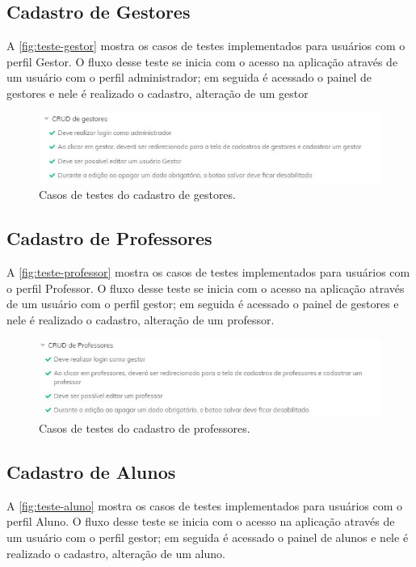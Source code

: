 \subsection{Cadastro de Gestores}
A \autoref{fig:teste-gestor} mostra os casos de testes implementados para usuários com o perfil Gestor. O fluxo desse teste se inicia com o acesso na aplicação através de um usuário com o perfil administrador; em seguida é acessado o painel de gestores e nele é realizado o cadastro, alteração de um gestor

\begin{figure}[htb]
    \centering
	\includegraphics[width=16cm]{imagens/tstGestor.JPG}
	\caption{\label{fig:teste-gestor} Casos de testes do cadastro de gestores.}
\end{figure}

\subsection{Cadastro de Professores}
A \autoref{fig:teste-professor} mostra os casos de testes implementados para usuários com o perfil Professor. O fluxo desse teste se inicia com o acesso na aplicação através de um usuário com o perfil gestor; em seguida é acessado o painel de gestores e nele é realizado o cadastro, alteração de um professor.

\begin{figure}[htb]
    \centering
	\includegraphics[width=16cm]{imagens/tstProfessor.JPG}
	\caption{\label{fig:teste-professor} Casos de testes do cadastro de professores.}
\end{figure}

\subsection{Cadastro de Alunos}
A \autoref{fig:teste-aluno} mostra os casos de testes implementados para usuários com o perfil Aluno. O fluxo desse teste se inicia com o acesso na aplicação através de um usuário com o perfil gestor; em seguida é acessado o painel de alunos e nele é realizado o cadastro, alteração de um aluno.

